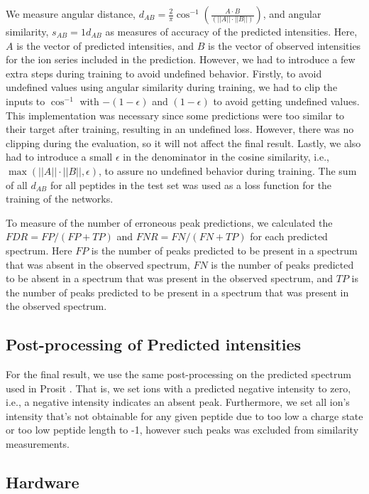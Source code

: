 \documentclass[10pt,a4paper]{article}
\begin{document}
We measure angular distance, $d_{AB}=\frac{2}{\pi} \cos^{-1}\left(\frac{A \cdot B}{(||A||\cdot||B||)}\right)$, and angular similarity, $s_{AB} = 1 d_{AB}$ as measures of accuracy of the predicted intensities. Here, $A$ is the vector of predicted intensities, and $B$ is the vector of observed intensities for the ion series included in the prediction. However, we had to introduce a few extra steps during training to avoid undefined behavior. Firstly, to avoid undefined values using angular similarity during training, we had to clip the inputs to $\cos^{-1}$ with $-(1-\epsilon)$ and $(1-\epsilon)$ to avoid getting undefined values. This implementation was necessary since some predictions were too similar to their target after training, resulting in an undefined loss. However, there was no clipping during the evaluation, so it will not affect the final result. Lastly, we also had to introduce a small $\epsilon$ in the denominator in the cosine similarity, i.e., $\max(||A||\cdot||B||, \epsilon)$, to assure no undefined behavior during training. The sum of all $d_{AB}$ for all peptides in the test set was used as a loss function for the training of the networks. 

To measure of the number of erroneous peak predictions, we calculated the $\mathit{FDR}=\mathit{FP}/(\mathit{FP}+\mathit{TP})$ and $\mathit{FNR}=\mathit{FN}/(\mathit{FN}+\mathit{TP})$ for each predicted spectrum. Here $\mathit{FP}$ is the number of peaks predicted to be present in a spectrum that was absent in the observed spectrum, $\mathit{FN}$ is the number of peaks predicted to be absent in a spectrum that was present in the observed spectrum, and $\mathit{TP}$ is the number of peaks predicted to be present in a spectrum that was present in the observed spectrum.

\subsection*{Post-processing of Predicted intensities}
For the final result, we use the same post-processing on the predicted spectrum used in Prosit ​\cite{Gessulat2019-el}. That is, we set ions with a predicted negative intensity to zero, i.e., a negative intensity indicates an absent peak. Furthermore, we set all ion's intensity that's not obtainable for any given peptide due to too low a charge state or too low peptide length to -1, however such peaks was excluded from similarity measurements.

\subsection*{Hardware}
\end{document}
